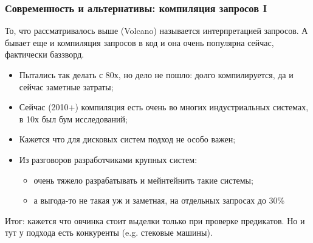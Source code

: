 \documentclass{beamer}
\begin{document}
\begin{frame}
\frametitle{Современность и альтернативы: компиляция запросов I}

	То, что рассматривалось выше (Volcano) называется \alert{интерпретацией} запросов. А бывает еще и \alert{компиляция} запросов в код и она очень популярна сейчас, фактически баззворд.
	
	\begin{itemize}
		\setlength\itemsep{1em}
		\item Пытались так делать с 80х, но дело не пошло: долго компилируется, да и сейчас заметные затраты;
		\item Сейчас (2010+) компиляция есть очень во многих индустриальных системах, в 10х был бум исследований;
		\item Кажется что для дисковых систем подход не особо важен;
		\item Из разговоров разработчиками крупных систем: 
		\begin{itemize}
			\item очень тяжело разрабатывать и мейнтейнить такие системы;
			\item а выгода-то не такая уж и заметная, на отдельных запросах до 30\%
		\end{itemize}	
	\end{itemize}
	
	Итог: кажется что овчинка стоит выделки только при проверке предикатов. Но и тут у подхода есть конкуренты (e.g. стековые машины).
\end{frame}
\end{document}
